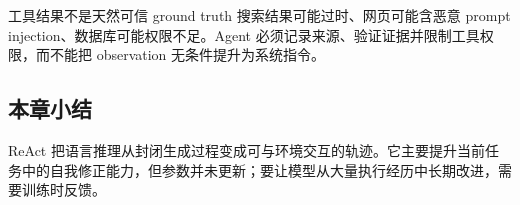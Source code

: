 \begin{warningbox}{工具结果不是天然可信 ground truth}
搜索结果可能过时、网页可能含恶意 prompt injection、数据库可能权限不足。Agent 必须记录来源、验证证据并限制工具权限，而不能把 observation 无条件提升为系统指令。
\end{warningbox}

\subsection{本章小结}

ReAct 把语言推理从封闭生成过程变成可与环境交互的轨迹。它主要提升当前任务中的自我修正能力，但参数并未更新；要让模型从大量执行经历中长期改进，需要训练时反馈。

